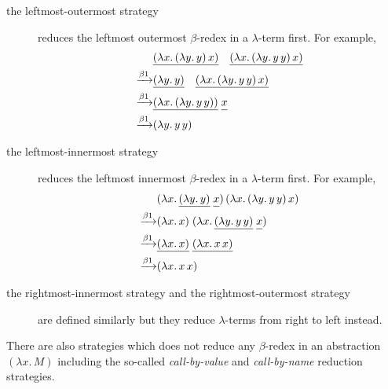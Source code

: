 \begin{description}
  \item[the leftmost-outermost strategy] reduces the leftmost outermost
    $\beta$-redex in a $\lambda$-term first. For example, 
    \begin{align*}
      & 
      \underline{(\lambda x.\, (\lambda y.\, y)\,x)}\quad
      \underline{(\lambda x.\, (\lambda y.\, y\,y)\,x)}
      \\
      \xrightarrow{\beta1} &
      \underline{(\lambda y.\, y)}\quad
      \underline{(\lambda x.\, (\lambda y.\, y\,y)\, x)} \\
      \xrightarrow{\beta1} &
      \underline{(\lambda x.\, (\lambda y.\, y\,y))}\;
      \underline{\vphantom{(\lambda}x} \\
      \xrightarrow{\beta1} & (\lambda y.\, y\,y)
    \end{align*}
  \item[the leftmost-innermost strategy] reduces the leftmost innermost
    $\beta$-redex in a $\lambda$-term first. For example, 
    \begin{align*}
      & (\lambda x.\, \underline{(\lambda y.\,
        y)}\;\underline{\vphantom{(\lambda} x})\,
      (\lambda x.\, (\lambda y.\, y\, y)\,x) \\
      \xrightarrow{\beta1} & (\lambda x.\,x)\;
      (\lambda x.\, \underline{(\lambda y.\, y\,
        y)}\;\underline{\vphantom{(\lambda}x}) \\
      \xrightarrow{\beta1} & \underline{(\lambda x.\,x)}\;\underline{(\lambda x.\, x\,x)} \\
      \xrightarrow{\beta1} & (\lambda x.\, x\, x)
    \end{align*}
  \item[the rightmost-innermost strategy and the rightmost-outermost strategy]
    are defined similarly but they reduce $\lambda$-terms from right to left
    instead.
\end{description}
There are also strategies which does not reduce any $\beta$-redex in an
abstraction~$(\lambda x.\, M)$ including the so-called
\emph{call-by-value} and \emph{call-by-name} reduction strategies.

